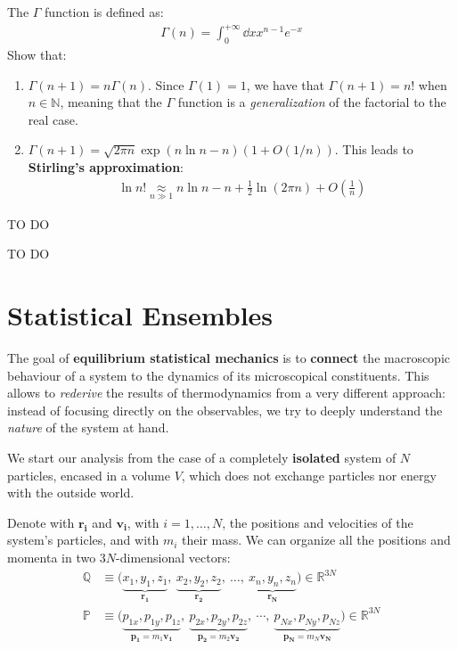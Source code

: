 \documentclass[../template.tex]{subfiles}
\begin{document}
\begin{exo}
    The $\Gamma$ function is defined as:
    \begin{align*}
        \Gamma(n) = \int_0^{+\infty} \dd{x} x^{n-1} e^{-x}
    \end{align*}
    Show that:
    \begin{enumerate}[label=\alph*.]
        \item $\Gamma(n+1) = n \Gamma(n)$. Since $\Gamma(1)=1$, we have that $\Gamma(n+1) = n!$ when $n \in \mathbb{N}$, meaning that the $\Gamma$ function is a \textit{generalization} of the factorial to the real case. 
        \item $\Gamma(n+1) = \sqrt{2 \pi n} \exp(n \ln n-n) (1+O(1/n))$. This leads to \textbf{Stirling's approximation}:
        \begin{align*}
            \ln n! \underset{n \gg 1}{\approx}  n \ln n - n + \frac{1}{2} \ln (2 \pi n) + O\left(\frac{1}{n} \right) 
        \end{align*} 
    \end{enumerate}
\end{exo}

\begin{exo}[10]\label{ex:saddle-domain}
    TO DO
\end{exo}

TO DO

\section{Statistical Ensembles}

The goal of \textbf{equilibrium statistical mechanics} is to \textbf{connect} the macroscopic behaviour of a system to the dynamics of its microscopical constituents. This allows to \textit{rederive} the results of thermodynamics from a very different approach: instead of focusing directly on the observables, we try to deeply understand the \textit{nature} of the system at hand.

\medskip

We start our analysis from the case of a completely \textbf{isolated} system of $N$ particles, encased in a volume $V$, which does not exchange particles nor energy with the outside world.

Denote with $\bm{r_i}$ and $\bm{v_i}$, with $i=1, \dots, N$, the positions and velocities of the system's particles, and with $m_i$ their mass. We can organize all the positions and momenta in two $3N$-dimensional vectors:
\begin{align*}
    \mathbb{Q} &\equiv \Big( \underbrace{x_1, y_1, z_1}_{\bm{r_1}},\> \underbrace{x_2, y_2, z_2}_{\bm{r_2}},\> \dots,\> \underbrace{x_n, y_n, z_n}_{\bm{r_N}}   \Big) \in \mathbb{R}^{3N}\\
    \mathbb{P} &\equiv \Big(\underbrace{p_{1x}, p_{1y}, p_{1z}}_{\bm{p_1}=m_1 \bm{v_1}},\> \underbrace{p_{2x}, p_{2y}, p_{2z}}_{\bm{p_2} = m_2 \bm{v_2}}, \>\cdots,\> \underbrace{p_{Nx}, p_{Ny}, p_{Nz}}_{\bm{p_N} = m_N \bm{v_N}} \Big) \in \mathbb{R}^{3N}
\end{align*}
\end{document}
